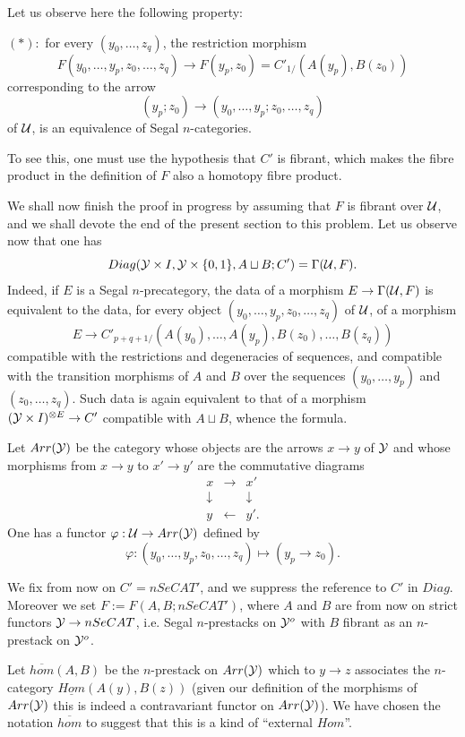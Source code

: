 Let us observe here the following property:

$(\ast ):$ for every $(y_0,\ldots , z_q)$,
the restriction morphism
$$
F(y_0,\ldots , y_p,z_0,\ldots ,z_q)\rightarrow F(y_p,z_0)
= C'_{1/}(A(y_p), B(z_0))
$$
corresponding to the arrow
$$
(y_p; z_0)\rightarrow (y_0,\ldots ,y_p; z_0,\ldots , z_q)
$$
of ${\cal U}$, is
an equivalence of Segal $n$-categories.

To see this, one must use
the hypothesis that $C'$ is fibrant, which makes the fibre product in the
definition of $F$ also a homotopy fibre product.

We shall now finish the proof in progress by assuming
that $F$ is fibrant over ${\cal U}$, and we shall devote the end of
the present section to this problem.
Let us observe now that one has
$$
Diag ({\cal Y} \times I, {\cal Y} \times \{ 0,1\} ,
A\sqcup B ; C') = \Gamma ({\cal U} , F).
$$
Indeed, if $E$ is a
Segal $n$-precategory, the data of a morphism
$E\rightarrow \Gamma ({\cal U} ,F)$
is equivalent to the data, for every object
$(y_0,\ldots , y_p,z_0,\ldots ,z_q)$ of ${\cal U}$, of a morphism
$$
E\rightarrow
C'_{p+q+1/}(A(y_0),\ldots , A(y_p),B(z_0),\ldots , B(z_q))
$$
compatible with the restrictions and
degeneracies of sequences,
and compatible with the transition morphisms of $A$ and $B$
over the sequences $(y_0,\ldots , y_p)$ and $(z_0,\ldots , z_q)$. Such
data is again equivalent to that of a
morphism $({\cal Y} \times I)^{\otimes E}\rightarrow C'$
compatible with $A\sqcup B$, whence the formula.

Let $Arr({\cal Y} )$ be the category whose objects are the arrows
$x\rightarrow y$ of ${\cal Y}$ and whose morphisms from
$x\rightarrow y$ to $x'\rightarrow y'$ are the commutative diagrams
$$
\begin{array}{ccc}
x & \rightarrow & x' \\
\downarrow && \downarrow \\
y& \leftarrow & y' .
\end{array}
$$
One has a functor $\varphi : {\cal U} \rightarrow Arr ({\cal Y} )$ defined by
$$
\varphi : (y_0,\ldots , y_p,z_0,\ldots , z_q)\mapsto (y_p\rightarrow z_0).
$$

We fix from now on $C'=nSeCAT'$, and we suppress the reference to
$C'$ in
$Diag$. Moreover we set $F:=F(A,B; nSeCAT')$,
where $A$ and $B$ are from now on
strict functors ${\cal Y} \rightarrow nSeCAT$,
i.e. Segal $n$-prestacks on ${\cal Y} ^o$ with
$B$
fibrant as an $n$-prestack on ${\cal Y}^o$.

Let $\overline{hom}(A,B)$ be the $n$-prestack on $Arr ({\cal Y} )$ which to
$y\rightarrow z$ associates the $n$-category \linebreak
$\underline{Hom}(A(y),B(z))$ (given our definition of the
morphisms of $Arr({\cal Y} )$ this
is indeed a contravariant functor on $Arr({\cal Y} )$). We have chosen
the notation $\overline{hom}$ to suggest
that this is a kind of ``external $Hom$''.

